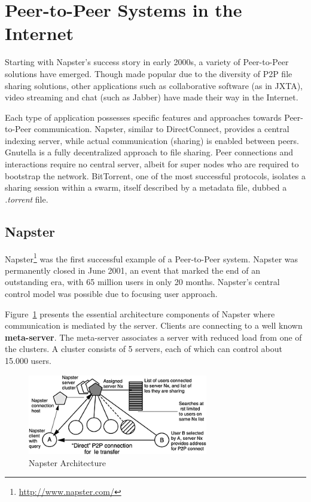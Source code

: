\section{Peer-to-Peer Systems in the Internet}
\label{sec:p2p-systems:p2p-internet}

Starting with Napster's success story in early 2000s, a variety of
Peer-to-Peer solutions have emerged. Though made popular due to the diversity
of P2P file sharing solutions, other applications such as collaborative
software (as in JXTA), video streaming and chat (such as Jabber) have made
their way in the Internet.

Each type of application possesses specific features and approaches towards
Peer-to-Peer communication. Napster, similar to DirectConnect, provides a
central indexing server, while actual communication (sharing) is enabled
between peers. Gnutella is a fully decentralized approach to file sharing.
Peer connections and interactions require no central server, albeit for super
nodes who are required to bootstrap the network. BitTorrent, one of the most
successful protocols, isolates a sharing session within a swarm, itself
described by a metadata file, dubbed a \textit{.torrent} file.

\subsection{Napster}

Napster\footnote{\url{http://www.napster.com/}} was the first successful example of a Peer-to-Peer
system. Napster was permanently closed in June 2001, an event that marked the
end of an outstanding era, with 65 million users in only 20 months. Napster's
central control model was possible due to focusing user approach.

Figure~\ref{fig:p2p-systems:napster} presents the essential architecture
components of Napster where communication is mediated by the server. Clients
are connecting to a well known \textbf{meta-server}. The meta-server
associates a server with reduced load from one of the clusters. A cluster
consists of 5 servers, each of which can control about 15.000 users.

\begin{figure}
  \centering
  \includegraphics[width=0.7\textwidth]{src/img/p2p-systems/napster}
  \caption{Napster Architecture}
  \label{fig:p2p-systems:napster}
\end{figure}

